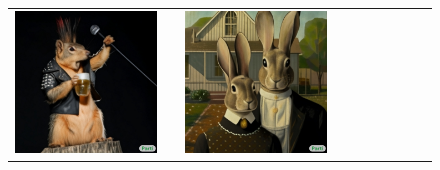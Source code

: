 \begin{figure}[ht!]
\begin{adjustwidth}{-0.8in}{-0.5in}  
    \centering                     
    \footnotesize
\setlength\tabcolsep{1pt}
\vspace{-0.2in}
\begin{tabular}{cccccccccccccccccccc}
\multicolumn{6}{c}{\includegraphics[width=\thirdcolwidth\textwidth]{figures/cherries/punk_squirrel.jpg} } &&
\multicolumn{6}{c}{\includegraphics[width=\thirdcolwidth\textwidth]{figures/cherries/american_gothic_rabbits.jpg}} &&

\end{tabular}
\end{adjustwidth}
\end{figure}

